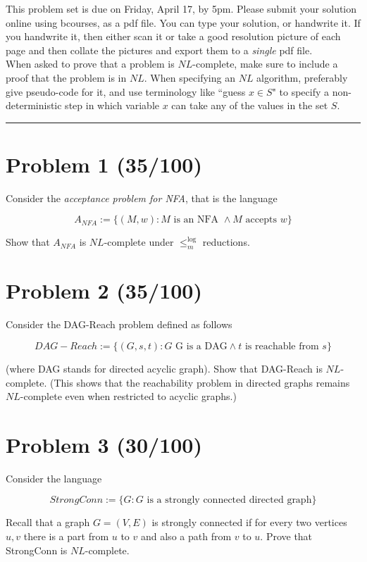 \documentclass[11pt]{article}
\begin{document}
This problem set is due on Friday, April 17, by 5pm. Please submit your solution online using bcourses,
as a pdf file.
You can type your solution, or handwrite it. If you handwrite it, then either
scan it or take a good resolution picture of each page and then collate the pictures
and export them to a {\em single} pdf file.
\\

\noindent When asked to prove that a problem is $NL$-complete,
make sure to include a proof that the problem is in $NL$. When
specifying  an $NL$ algorithm, preferably give pseudo-code
for it, and use terminology like ``guess $x\in S$" to specify a
non-deterministic step in which variable $x$ can take any of the
values in the set $S$. 
\bigskip
\hrule



\section*{Problem 1 (35/100)}
Consider the {\em acceptance problem for
NFA}, that is the language 

\[ A_{NFA} := \{ (M,w) : M \mbox{ is an NFA } \wedge M \mbox{ accepts } w \} \]

\noindent Show that $A_{NFA}$ is $NL$-complete under $\leq_m^{\log}$ reductions.


\section*{Problem 2 (35/100)}
Consider the DAG-Reach problem defined as follows

\[ DAG-Reach := \{ (G,s,t) : G \mbox{ G is a DAG} \wedge t \mbox{ is
reachable from } s \} \]

\noindent (where DAG stands for directed acyclic graph). Show that
DAG-Reach is $NL$-complete. (This shows that the reachability
problem in directed graphs remains $NL$-complete even when
restricted to acyclic graphs.)


\section*{Problem 3 (30/100)}
Consider the language

\[ StrongConn := \{ G : G \mbox { is a strongly connected directed graph} \} \]

\noindent Recall that a graph $G=(V,E)$ is strongly connected if for every two
vertices $u,v$ there is a part from $u$ to $v$ and also a path
from $v$ to $u$. Prove that StrongConn is $NL$-complete.

\end{document}

